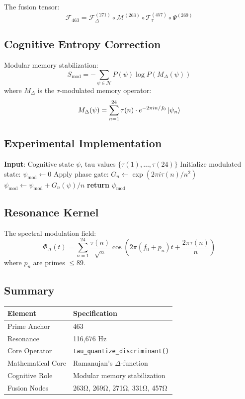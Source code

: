 \documentclass[12pt]{article}
\begin{document}
\noindent The fusion tensor:
\[
\mathcal{F}_{463} = \mathcal{F}_\Delta^{(271)} \circ \mathcal{M}^{(263)} \circ \mathcal{T}_\tau^{(457)} \circ \Psi^{(269)}
\]

\subsection*{Cognitive Entropy Correction}
Modular memory stabilization:
\[
S_{\text{mod}} = -\sum_{\psi \in \mathcal{H}} P(\psi) \log P(M_\Delta(\psi))
\]
where $M_\Delta$ is the $\tau$-modulated memory operator:
\[
M_\Delta(\psi) = \sum_{n=1}^{24} \tau(n) \cdot e^{-2\pi i n/f_0} \ket{\psi_n}
\]

\subsection*{Experimental Implementation}
\begin{algorithm}[H]
\caption{$\tau$-Driven Memory Encoding}
\begin{algorithmic}[1]
\State \textbf{Input}: Cognitive state $\psi$, tau values $\{\tau(1),\dots,\tau(24)\}$
\State Initialize modulated state: $\psi_{\text{mod}} \gets 0$
    \State Apply phase gate: $G_n \gets \exp(2\pi i \tau(n)/n^2)$
    \State $\psi_{\text{mod}} \gets \psi_{\text{mod}} + G_n(\psi)/n$
\EndFor
\State \textbf{return} $\psi_{\text{mod}}$ 
\end{algorithmic}
\end{algorithm}

\subsection*{Resonance Kernel}
The spectral modulation field:
\[
\Phi_\Delta(t) = \sum_{n=1}^{24} \frac{\tau(n)}{\sqrt{n}} \cos\left(2\pi(f_0 + p_n)t + \frac{2\pi\tau(n)}{n}\right)
\]
where $p_n$ are primes $\leq 89$.

\subsection*{Summary}
\begin{table}[h]
\centering
\begin{tabular}{ll}
\toprule
\textbf{Element} & \textbf{Specification} \\
\midrule
Prime Anchor & 463 \\
Resonance & 116,676 Hz \\
Core Operator & \texttt{tau\_quantize\_discriminant()} \\
Mathematical Core & Ramanujan's $\Delta$-function \\
Cognitive Role & Modular memory stabilization \\
Fusion Nodes & 263Ω, 269Ω, 271Ω, 331Ω, 457Ω \\
\bottomrule
\end{tabular}
\end{table}
\end{document}

